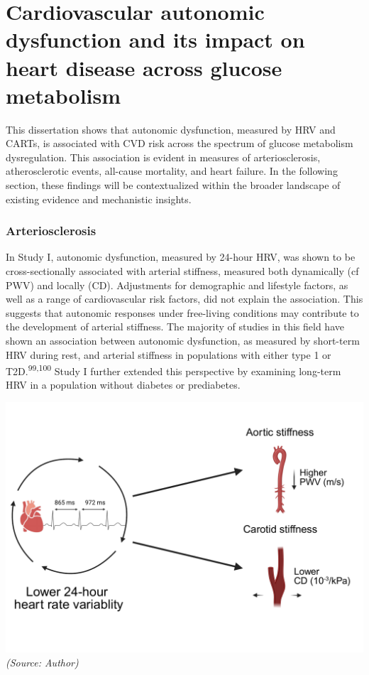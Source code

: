 \documentclass[
  a4paper,
  headsepline=true,
  open=left]{scrbook}
\begin{document}
\hypertarget{cardiovascular-autonomic-dysfunction-and-its-impact-on-heart-disease-across-glucose-metabolism}{%
\section{Cardiovascular autonomic dysfunction and its impact on heart
disease across glucose
metabolism}\label{cardiovascular-autonomic-dysfunction-and-its-impact-on-heart-disease-across-glucose-metabolism}}

This dissertation shows that autonomic dysfunction, measured by HRV and
CARTs, is associated with CVD risk across the spectrum of glucose
metabolism dysregulation. This association is evident in measures of
arteriosclerosis, atherosclerotic events, all-cause mortality, and heart
failure. In the following section, these findings will be contextualized
within the broader landscape of existing evidence and mechanistic
insights.

\hypertarget{arteriosclerosis-1}{%
\subsubsection{Arteriosclerosis}\label{arteriosclerosis-1}}

In Study I, autonomic dysfunction, measured by 24-hour HRV, was shown to
be cross-sectionally associated with arterial stiffness, measured both
dynamically (cf PWV) and locally (CD). Adjustments for demographic and
lifestyle factors, as well as a range of cardiovascular risk factors,
did not explain the association. This suggests that autonomic responses
under free-living conditions may contribute to the development of
arterial stiffness. The majority of studies in this field have shown an
association between autonomic dysfunction, as measured by short-term HRV
during rest, and arterial stiffness in populations with either type 1 or
T2D.\textsuperscript{99,100} Study I further extended this perspective
by examining long-term HRV in a population without diabetes or
prediabetes.

\includegraphics{images/hrv_arterial_stiffness.pdf} \emph{(Source:
Author)}
\end{document}
